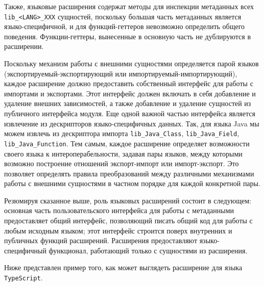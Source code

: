 Также, языковые расширения содержат методы для инспекции метаданных всех \texttt{lib\_<LANG>\_XXX} сущностей, поскольку большая часть метаданных является языко-специфичной, и для функций-геттеров невозможно определить общего поведения. Функции-геттеры, вынесенные в основную часть не дублируются в расширении.

Поскольку механизм работы с внешними сущностями определяется парой языков (экспортируемый-экспортирующий или импортируемый-импортирующий), каждое расширение должно предоставить собственный интерфейс для работы с импортами и экспортами. Этот интерфейс должен включать в себя добавление и удаление внешних зависимостей, а также добавление и удаление сущностей из публичного интерфейса модуля. Еще одной важной частью интерфейса является извлечение из дескрипторов языко-специфичных данных. Так, для языка Java мы можем извлечь из дескриптора импорта \texttt{lib\_Java\_Class}, \texttt{lib\_Java\_Field}, \texttt{lib\_Java\_Function}. Тем самым, каждое расширение определяет возможности своего языка к интероперабельности, задавая пары языков, между которыми возможно построение отношений экспорт-импорт или импорт-экспорт. Это позволяет определять правила преобразований между различными механизмами работы с внешними сущностями в частном порядке для каждой конкретной пары.

Резюмируя сказанное выше, роль языковых расширений состоит в следующем: основная часть пользовательского интерфейса для работы с метаданными предоставляет общий интерфейс, позволяющий писать общий код для работы с любым исходным языком; этот интерфейс строится поверх внутренних и публичных функций расширений. Расширения предоставляют языко-специфичный функционал, работающий только с сущностями из расширения.

Ниже представлен пример того, как может выглядеть расширение для языка \texttt{TypeScript}.

